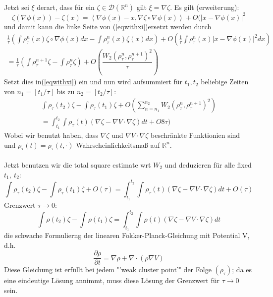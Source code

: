 \documentclass[11pt,a4paper,notitlepage]{scrreprt}
\newcommand{\RR}{\mathbb{R}}
\begin{document}
Jetzt sei $\xi$ derart, dass für ein $\zeta\in\mathcal{D}(\RR^n)$ gilt $\xi=\nabla\zeta$. Es gilt (erweiterung):
\begin{equation}
\zeta(\nabla\phi(x))-\zeta(x)=\left\langle\nabla\phi(x)-x,\nabla\zeta\circ\nabla\phi(x)\right\rangle+O(\vert x-\nabla\phi(x)\vert^2
\end{equation}
und damit kann die linke Seite von (\ref{eqwithxi})ersetzt werden durch
\begin{align*}
\frac{1}{\tau}\left(\int \rho_\tau^n(x)\zeta\circ\nabla\phi(x)dx-\int\rho_\tau^n(x)\zeta(x)dx\right)+O\left(\frac{1}{\tau}\int\rho_\tau^n(x)\vert x-\nabla\phi(x)\vert^2dx\right)\\
=\frac{1}{\tau}\left(\int\rho_\tau^{n+1}\zeta-\int\rho_\tau^n\zeta\right)+O\left(\dfrac{W_2(\rho_\tau^n,\rho_\tau^{n+1})^2}{\tau}\right)
\end{align*}
Setzt dies in(\ref{eqwithxi}) ein und  nun wird aufsummiert für $t_1,t_2$ beliebige Zeiten von $n_1=[t_1/\tau]$ bis zu $n_2=[t_2/\tau]$:
\begin{eqnarray}
\int\rho_\tau(t_2)\zeta-\int\rho_\tau(t_1)\zeta+O\left(\sum_{n=n_1}^{n_2}W_2(\rho_\tau^n,\rho_\tau^{n+1})^2\right)\\
=\int_{t_1}^{t_2}\int\rho_\tau(t)(\nabla\zeta-\nabla V\cdot\nabla\zeta)dt+O8\tau)
\end{eqnarray}
Wobei wir benutzt haben, dass $\nabla\zeta$ und $\nabla V\cdot\nabla\zeta$ beschränkte Funktionien sind und $\rho_\tau(t)=\rho_\tau(t,\cdot)$ Wahrscheinlichkeitsmaß auf $\RR^n$.\\\\
Jetzt benutzen wir die total square estimate wrt $W_2$ und deduzieren für alle fixed $t_1,~t_2$:
\begin{equation}
\int\rho_\tau(t_2)\zeta-\int\rho_\tau(t_1)\zeta+O(\tau)=\int_{t_1}^{t_2}\int\rho_\tau(t)(\nabla\zeta-\nabla V\cdot\nabla\zeta)dt+O(\tau)
\end{equation}
Grenzwert $\tau\to 0$:
\begin{equation}
\int\rho(t_2)\zeta-\int\rho(t_1)\zeta=\int_{t_1}^{t_2}\int\rho(t)(\nabla\zeta-\nabla V\cdot\nabla\zeta)dt
\end{equation}
die schwache Formulierng der linearen Fokker-Planck-Gleichung mit Potential V, d.h.
\begin{equation}
\dfrac{\partial\rho}{\partial t}=\nabla\rho+\nabla\cdot(\rho\nabla V)
\end{equation}
Diese Gleichung ist erfüllt bei jedem "'weak cluster point'" der Folge $(\rho_\tau)$; da es eine eindeutige Lösung annimmt, muss diese Lösung der Grenzwert für $\tau\to 0$ sein.
\end{document}
